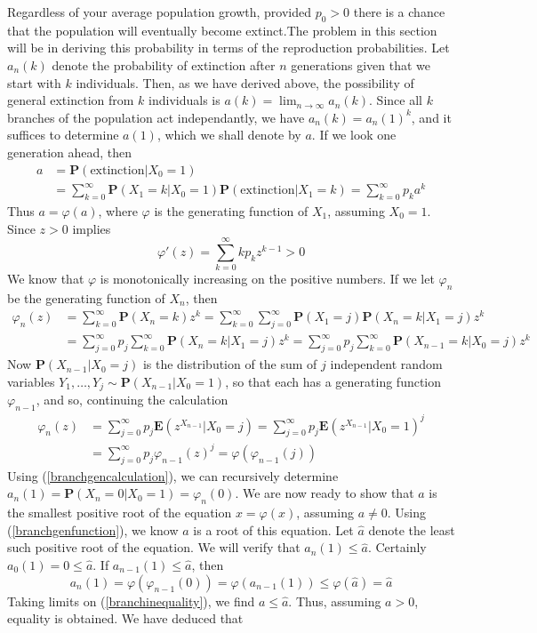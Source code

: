 Regardless of your average population growth, provided $p_0 > 0$ there is a chance that the population will eventually become extinct.The problem in this section will be in deriving this probability in terms of the reproduction probabilities. Let $a_n(k)$ denote the probability of extinction after $n$ generations given that we start with $k$ individuals. Then, as we have derived above, the possibility of general extinction from $k$ individuals is $a(k)=\lim_{n \to \infty} a_n(k)$. Since all $k$ branches of the population act independantly, we have $a_n(k) = a_n(1)^k$, and it suffices to determine $a(1)$, which we shall denote by $a$. If we look one generation ahead, then
%
\begin{align} a &= \mathbf{P}(\text{extinction}|X_0 = 1)\\
&= \label{branchgenfunction} \sum_{k = 0}^\infty \mathbf{P}(X_1 = k | X_0 = 1) \mathbf{P}(\text{extinction}| X_1 = k) = \sum_{k = 0}^\infty p_k a^k \end{align}
%
Thus $a = \varphi(a)$, where $\varphi$ is the generating function of $X_1$, assuming $X_0 = 1$. Since $z > 0$ implies
%
\[ \varphi'(z) = \sum_{k = 0}^\infty k p_k z^{k-1} > 0 \]
%
We know that $\varphi$ is monotonically increasing on the positive numbers. If we let $\varphi_n$ be the generating function of $X_n$, then
%
\begin{align*} \varphi_n(z) &= \sum_{k = 0}^\infty \mathbf{P}(X_n = k) z^k = \sum_{k = 0}^\infty \sum_{j = 0}^\infty \mathbf{P}(X_1 = j) \mathbf{P}(X_n = k | X_1 = j) z^k\\
&= \sum_{j = 0}^\infty p_j \sum_{k = 0}^\infty \mathbf{P}(X_n = k | X_1 = j) z^k = \sum_{j = 0}^\infty p_j \sum_{k = 0}^\infty \mathbf{P}(X_{n-1} = k | X_0 = j) z^k \end{align*}
%
Now $\mathbf{P}(X_{n-1} | X_0 = j)$ is the distribution of the sum of $j$ independent random variables $Y_1, \dots, Y_j \sim \mathbf{P}(X_{n-1} | X_0 = 1)$, so that each has a generating function $\varphi_{n-1}$, and so, continuing the calculation
%
\begin{align}
    \varphi_n(z) &= \sum_{j = 0}^\infty p_j \mathbf{E}(z^{X_{n-1}} | X_0 = j) = \sum_{j = 0}^\infty p_j \mathbf{E}(z^{X_{n-1}} | X_0 = 1)^j\\
    &= \label{branchgencalculation} \sum_{j = 0}^\infty p_j \varphi_{n-1}(z)^j = \varphi(\varphi_{n-1}(j))
\end{align}
%
Using (\ref{branchgencalculation}), we can recursively determine $a_n(1) = \mathbf{P}(X_n = 0 | X_0 = 1) = \varphi_n(0)$. We are now ready to show that $a$ is the smallest positive root of the equation $x = \varphi(x)$, assuming $a \neq 0$. Using (\ref{branchgenfunction}), we know $a$ is a root of this equation. Let $\hat{a}$ denote the least such positive root of the equation. We will verify that $a_n(1) \leq \hat{a}$. Certainly $a_0(1) = 0 \leq \hat{a}$. If $a_{n-1}(1) \leq \hat{a}$, then
%
\begin{equation} \label{branchinequality} a_n(1) = \varphi(\varphi_{n-1}(0)) = \varphi(a_{n-1}(1)) \leq \varphi(\hat{a}) = \hat{a} \end{equation}
%
Taking limits on (\ref{branchinequality}), we find $a \leq \hat{a}$. Thus, assuming $a > 0$, equality is obtained. We have deduced that

